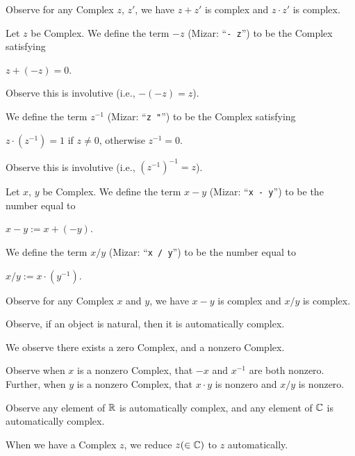 \documentclass{article}
\begin{document}
Observe for any Complex $z$, $z'$, we have $z+z'$ is complex and $z\cdot z'$
is complex.

\begin{definition}
Let $z$ be Complex.
We define the term $-z$ (Mizar: ``\verb#- z#'') to be the Complex satisfying
\begin{defn}
\item $z + (-z)=0$.
\end{defn}
Observe this is involutive (i.e., $-(-z)=z$).

We define the term $z^{-1}$ (Mizar: ``\verb#z "#'') to be the Complex
satisfying
\begin{defn}
\item $z\cdot(z^{-1})=1$ if $z\neq0$, otherwise $z^{-1}=0$.
\end{defn}
Observe this is involutive (i.e., $(z^{-1})^{-1}=z$).
\end{definition}

\begin{definition}
Let $x$, $y$ be Complex.
We define the term $x - y$ (Mizar: ``\verb#x - y#'') to be the number
equal to
\begin{defn}
\item $x - y := x + (-y)$.
\end{defn}
We define the term $x/y$ (Mizar: ``\verb#x / y#'') to be the number
equal to
\begin{defn}
\item $x/y := x\cdot(y^{-1})$.
\end{defn}
\end{definition}

Observe for any Complex $x$ and $y$, we have $x-y$ is complex and $x/y$
is complex.

Observe, if an object is natural, then it is automatically complex.

We observe there exists a zero Complex, and a nonzero Complex.

Observe when $x$ is a nonzero Complex, that $-x$ and $x^{-1}$ are both nonzero.
Further, when $y$ is a nonzero Complex, that $x\cdot y$ is nonzero and
$x/y$ is nonzero.

Observe any element of $\mathbb{R}$ is automatically complex, and any element
of $\mathbb{C}$ is automatically complex.

When we have a Complex $z$, we reduce $z(\in \mathbb{C})$ to $z$ automatically.
\end{document}
